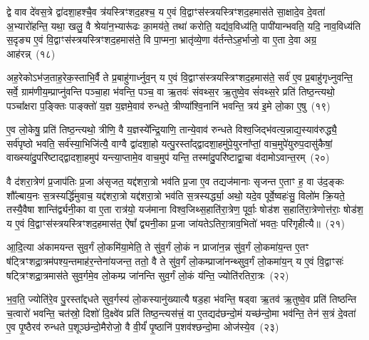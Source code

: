 {\anuvakamend[{ग॒च्छ॒न्ति॒ य॒न्ति॒ त्रि॒ꣳ॒शद॑क्षरा॒ द्वाविꣳ॑शतिश्च}]}%

द्वे वाव दे॑वस॒त्रे द्वा॑दशा॒हश्चै॒व त्र॑यस्त्रिꣳशद॒हश्च॒ य ए॒वं वि॒द्वाꣳस॑स्त्रयस्त्रिꣳशद॒हमास॑ते सा॒क्षादे॒व दे॒वता॑ अ॒भ्यारो॑हन्ति॒ यथा॒ खलु॒ वै श्रेया॑न॒भ्यारू॑ढः का॒मय॑ते॒ तथा॑ करोति॒ यद्य॑व॒विध्य॑ति॒ पापी॑यान्भवति॒ यदि॒ नाव॒विध्य॑ति स॒दृङ्य ए॒वं वि॒द्वाꣳस॑स्त्रयस्त्रिꣳशद॒हमास॑ते॒ वि पा॒प्मना॒ भ्रातृ॑व्ये॒णा व॑र्तन्ते\-ऽह॒र्भाजो॒ वा ए॒ता दे॒वा अग्र॒ आह॑रन्न्~(१८)

अह॒रेको\-ऽभ॑ज॒ताह॒रेक॒स्ताभि॒र्वै ते प्र॒बाहु॑गार्ध्नुव॒न् य ए॒वं वि॒द्वाꣳस॑स्त्रयस्त्रिꣳशद॒हमास॑ते॒ सर्व॑ ए॒व प्र॒बाहु॑गृध्नुवन्ति॒ सर्वे॒ ग्राम॑णीय॒म्प्राप्नु॑वन्ति पञ्चा॒हा भ॑वन्ति॒ पञ्च॒ वा ऋ॒तवः॑ संवथ्स॒र ऋ॒तुष्वे॒व सं॑वथ्स॒रे प्रति॑ तिष्ठ॒न्त्यथो॒ पञ्चा᳚क्षरा प॒ङ्क्तिः पाङ्क्तो॑ य॒ज्ञ य॒ज्ञमे॒वाव॑ रुन्धते॒ त्रीण्या᳚श्वि॒नानि॑ भवन्ति॒ त्रय॑ इ॒मे लो॒का ए॒षु~(१९)

ए॒व लो॒केषु॒ प्रति॑ तिष्ठ॒न्त्यथो॒ त्रीणि॒ वै य॒ज्ञस्ये᳚न्द्रि॒याणि॒ तान्ये॒वाव॑ रुन्धते विश्व॒जिद्भ॑वत्य॒न्नाद्य॒स्याव॑रुद्ध्यै॒ सर्व॑पृष्ठो भवति॒ सर्व॑स्या॒भिजि॑त्यै॒ वाग्वै द्वा॑दशा॒हो यत्पु॒रस्ता᳚द्द्वादशा॒हमु॑पे॒युरना᳚प्तां॒ वाच॒मुपे॑युरुप॒दासु॑कैषां॒ वाख्स्या॑दु॒परि॑ष्टाद्द्वादशा॒हमुप॑ यन्त्या॒प्तामे॒व वाच॒मुप॑ यन्ति॒ तस्मा॑दु॒परि॑ष्टाद्वा॒चा व॑दामो\-ऽवान्त॒रम्~(२०)

वै द॑शरा॒त्रेण॑ प्र॒जा\-प॑तिः प्र॒जा अ॑सृजत॒ यद्द॑शरा॒त्रो भव॑ति प्र॒जा ए॒व तद्यज॑मानाः सृजन्त ए॒ताꣳ ह॒ वा उ॑द॒ङ्कः शौ᳚ल्बाय॒नः स॒त्रस्यर्द्धि॑मुवाच॒ यद्द॑शरा॒त्रो यद्द॑शरा॒त्रो भव॑ति स॒त्रस्यर्द्ध्या॒ अथो॒ यदे॒व पूर्वे॒ष्वहः॑सु॒ विलो॑म क्रि॒यते॒ तस्यै॒वैषा शान्ति॑र्द्व्यनी॒का वा ए॒ता रात्र॑यो॒ यज॑माना विश्व॒जिथ्स॒हाति॑रा॒त्रेण॒ पूर्वाः॒ षोड॑श स॒हाति॑रा॒त्रेणोत्त॑राः॒ षोड॑श॒ य ए॒वं वि॒द्वाꣳस॑स्त्रयस्त्रिꣳशद॒हमास॑त॒ ऐ॑षां᳚ द्व्यनी॒का प्र॒जा जा॑यते\-ऽतिरा॒त्राव॒भितो॑ भवतः॒ परि॑गृहीत्यै॥~(२१)

{\anuvakamend[{अ॒ह॒र॒न्ने॒ष्व॑वान्त॒रꣳ षोड॑श स॒ह स॒प्तद॑श च}]}%

आ॒दि॒त्या अ॑कामयन्त सुव॒र्गं लो॒कमि॑या॒मेति॒ ते सु॑व॒र्गं लो॒कं न प्राजा॑न॒न्न सु॑व॒र्गं लो॒कमा॑य॒न्त ए॒तꣳ ष॑ट्त्रिꣳशद्रा॒त्रम॑पश्य॒न्तमाह॑र॒न्तेना॑यजन्त॒ ततो॒ वै ते सु॑व॒र्गं लो॒कम्प्राजा॑नन्थ्सुव॒र्गं लो॒कमा॑य॒न् य ए॒वं वि॒द्वाꣳसः॑ षट्त्रिꣳशद्रा॒त्रमास॑ते सुव॒र्गमे॒व लो॒कम्प्र जा॑नन्ति सुव॒र्गं लो॒कं य॑न्ति॒ ज्योति॑रतिरा॒त्रः~(२२)

भ॒व॒ति॒ ज्योति॑रे॒व पु॒रस्ता᳚द्दधते सुव॒र्गस्य॑ लो॒कस्यानु॑ख्यात्यै षड॒हा भ॑वन्ति॒ षड्वा ऋ॒तव॑ ऋ॒तुष्वे॒व प्रति॑ तिष्ठन्ति च॒त्वारो॑ भवन्ति॒ चत॑स्रो॒ दिशो॑ दि॒क्ष्वे॑व प्रति॑ तिष्ठ॒न्त्यस॑त्त्रं॒ वा ए॒तद्यद॑छन्दो॒मं यच्छ॑न्दो॒मा भव॑न्ति॒ तेन॑ स॒त्रं दे॒वता॑ ए॒व पृ॒ष्ठैरव॑ रुन्धते प॒शूञ्छ॑न्दो॒मैरोजो॒ वै वी॒र्यं॑ पृ॒ष्ठानि॑ प॒शव॑श्छन्दो॒मा ओज॑स्ये॒व~(२३)

